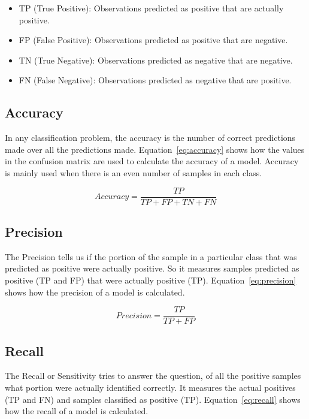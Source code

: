 \documentclass[12pt, a4paper,oneside]{report}
\begin{document}
\begin{itemize}
	\item TP (True Positive): Observations predicted as positive that are actually positive.
	\item FP (False Positive): Observations predicted as positive that are negative.
	\item TN (True Negative): Observations predicted as negative that are negative.
	\item FN (False Negative): Observations predicted as negative that are positive.
\end{itemize}

\subsection{Accuracy}
In any classification problem, the accuracy is the number of correct predictions made over all the predictions made. Equation~\ref{eq:accuracy} shows how the values in the confusion matrix are used to calculate the accuracy of a model. Accuracy is mainly used when there is an even number of samples in each class.

\begin{equation}
Accuracy = \frac{TP}{TP + FP + TN + FN} \label{eq:accuracy}
\end{equation}


\subsection{Precision}
The Precision tells us if the portion of the sample in a particular class that was predicted as positive were actually positive. So it measures samples predicted as positive (TP and FP) that were actually positive (TP). Equation~\ref{eq:precision} shows how the precision of a model is calculated.

\begin{equation}
Precision = \frac{TP}{TP + FP} \label{eq:precision}
\end{equation}

\subsection{Recall}
The Recall or Sensitivity tries to answer the question, of all the positive samples what portion were actually identified correctly.
It measures the actual positives (TP and FN) and samples classified as positive (TP). Equation~\ref{eq:recall} shows how the recall of a model is calculated.
\end{document}
